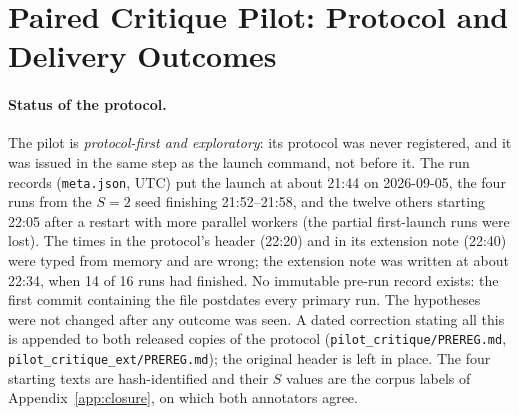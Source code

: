 \begin{table}[htbp]\centering\scriptsize
\caption{\RULESROWS\ rules over the \CRNBases\ originals and \CRNMutants\ mutants, both graders required, repair-tolerant convention (broken accepted, sound rejected; first run). Name map: score $\ge 5$ is the pass mark, score $=7$ the strict mark, the completeness verdict the completeness flag, closure rating $S{=}2$ the closure rule (a written-mechanism rule) and witness $S_{\mathrm{valid}}{=}2$ the witness rule. The closure and witness rows are reference-guided (their prompts carry the marking scheme; Appendix~\ref{app:planted-arms}) and are not information-matched to the rows above; both were run once. As binary gates the pass mark, closure and witness rules are prespecified and the strict mark and flag post hoc; the routing columns are post hoc. In the re-query the strict mark gives (\CRStrictBrokenAccR, \CRStrictSoundRejR) and the flag (\CRFlagBrokenAccR, \CRFlagSoundRejR); routed, the flag refers \CRRouteFlagRefR, passing \CRRouteFlagBrokenR\ broken and refusing \CRRouteFlagSoundR\ sound texts.}
\label{tab:rules-all}
\RULESTABLE
\end{table}

\begin{table}[htbp]\centering\footnotesize\setlength{\tabcolsep}{3pt}
\caption{Planted-defect gate comparison, every gate and model: false accepts on fatal and gap mutants, false rejects on originals, harmless edits accepted, and locus hits.}
\label{tab:planted}
\resizebox{\textwidth}{!}{\PLANTTABLE}
\end{table}

\clearpage
\section{Paired Critique Pilot: Protocol and Delivery Outcomes}
\label{app:pilot}
\paragraph{Status of the protocol.} The pilot is \emph{protocol-first and exploratory}: its protocol was never registered, and it was issued in the same step as the launch command, not before it. The run records (\texttt{meta.json}, UTC) put the launch at about 21:44 on 2026-09-05, the four runs from the $S{=}2$ seed finishing 21:52--21:58, and the twelve others starting 22:05 after a restart with more parallel workers (the partial first-launch runs were lost). The times in the protocol's header (22:20) and in its extension note (22:40) were typed from memory and are wrong; the extension note was written at about 22:34, when 14 of 16 runs had finished. No immutable pre-run record exists: the first commit containing the file postdates every primary run. The hypotheses were not changed after any outcome was seen. A dated correction stating all this is appended to both released copies of the protocol (\texttt{pilot\_critique/\allowbreak PREREG.md}, \texttt{pilot\_critique\_ext/\allowbreak PREREG.md}); the original header is left in place. The four starting texts are hash-identified and their $S$ values are the corpus labels of Appendix~\ref{app:closure}, on which both annotators agree.

